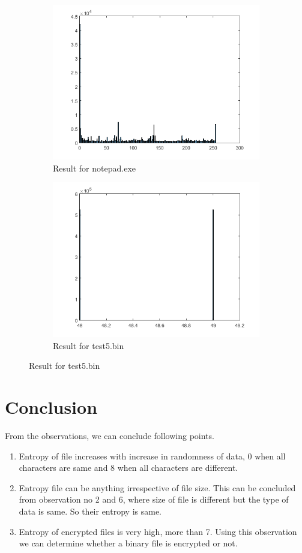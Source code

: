 \documentclass[oneside,a4paper,12pt]{report}
\begin{document}
\begin{figure}
\begin{subfigure}{0.5\textwidth}
\includegraphics[scale=0.5]{test5.png}
\caption{Result for notepad.exe}
\end{subfigure}
\begin{subfigure}{0.5\textwidth}
\includegraphics[scale=0.5]{test6.png}
\caption{Result for test5.bin}
\end{subfigure}
\end{figure}


\chapter{Conclusion}
From the observations, we can conclude following points.
\begin{enumerate}
\item Entropy of file increases with increase in randomness of data, 0 when all characters are same and 8 when all characters are different.
\item Entropy file can be anything irrespective of file size. This can be concluded from observation no 2 and 6, where size of file is different but the type of data is same. So their entropy is same.
\item Entropy of encrypted files is very high, more than 7. Using this observation we can determine whether a binary file is encrypted or not.
\end{enumerate}
\end{document}
